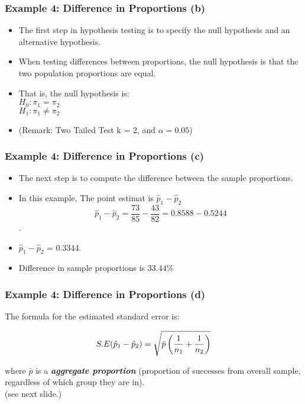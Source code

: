 \documentclass[a4]{beamer}
\begin{document}
\begin{frame}
\frametitle{Example 4: Difference in Proportions (b)}
\vspace{-1cm}
\begin{itemize}
\item
The first step in hypothesis testing is to specify the null hypothesis and an alternative hypothesis.
\item When testing differences between proportions, the null hypothesis is that the two population proportions are equal.
\item That is, the null hypothesis is:\\
$H_0: \pi_1 = \pi_2$\\
$H_1: \pi_1 \neq \pi_2$\\
\item (Remark: Two Tailed Test k = 2, and $\alpha = 0.05$)
\end{itemize}

\end{frame}
\begin{frame}
\frametitle{Example 4: Difference in Proportions (c)}
\vspace{-1cm}
\begin{itemize}
\item The next step is to compute the difference between the sample proportions.
\item In this example, The point estimat is $\hat{p}_1 - \hat{p}_2$ 
\[\hat{p}_1 - \hat{p}_2 = \frac{73}{85} - \frac{43}{82} = 0.8588 - 0.5244\].
\item $\hat{p}_1 - \hat{p}_2$ =  0.3344.
\item Difference in sample proportions is $33.44\%$
\end{itemize}
\end{frame}



\begin{frame}
\frametitle{Example 4: Difference in Proportions (d)}
\vspace{-1cm}
The formula for the estimated standard error is:

\[ S.E (\hat{p}_1 - \hat{p}_2)  = \sqrt{\bar{p} \left( {1 \over n_1} + {1 \over n_2}  \right)} \]


where $\bar{p}$ is a \textit{\textbf{aggregate proportion}} (proportion of successes from overall sample, regardless of which group they are in).
\\
(see next slide.)
\end{frame}
\end{document}
